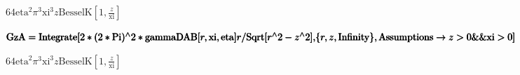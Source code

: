 \documentclass{article}
\begin{document}
\begin{doublespace}
\noindent\(64 \text{eta}^2 \pi ^3 \text{xi}^3 z \text{BesselK}\left[1,\frac{z}{\text{xi}}\right]\)
\end{doublespace}

\begin{doublespace}
\noindent\(\pmb{\text{GzA}=\text{Integrate}[2*(2*\text{Pi}){}^{\wedge}2*\text{gammaDAB}[r,\text{xi},\text{eta}]r/\text{Sqrt}[r{}^{\wedge}2-z{}^{\wedge}2],}\\
\pmb{\{r,z,\text{Infinity}\}, \text{Assumptions}\to z>0\&\&\text{xi}>0]}\)
\end{doublespace}

\begin{doublespace}
\noindent\(64 \text{eta}^2 \pi ^3 \text{xi}^3 z \text{BesselK}\left[1,\frac{z}{\text{xi}}\right]\)
\end{doublespace}
\end{document}
